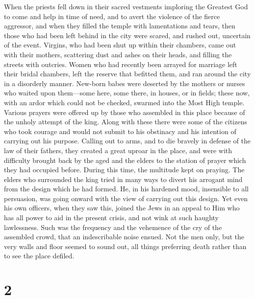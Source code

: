  When the priests fell down in their sacred vestments
imploring the Greatest God to come and help in time of need, and to
avert the violence of the fierce aggressor, and when they filled the
temple with lamentations and tears,  then those who had
been left behind in the city were scared, and rushed out, uncertain of
the event.  Virgins, who had been shut up within their
chambers, came out with their mothers, scattering dust and ashes on
their heads, and filling the streets with outcries. 
Women who had recently been arrayed for marriage left their bridal
chambers, left the reserve that befitted them, and ran around the city
in a disorderly manner.  New-born babes were deserted by
the mothers or nurses who waited upon them---some here, some there, in
houses, or in fields; these now, with an ardor which could not be
checked, swarmed into the Most High temple.  Various
prayers were offered up by those who assembled in this place because of
the unholy attempt of the king.  Along with these there
were some of the citizens who took courage and would not submit to his
obstinacy and his intention of carrying out his purpose. 
Calling out to arms, and to die bravely in defense of the law of their
fathers, they created a great uproar in the place, and were with
difficulty brought back by the aged and the elders to the station of
prayer which they had occupied before.  During this time,
the multitude kept on praying.  The elders who surrounded
the king tried in many ways to divert his arrogant mind from the design
which he had formed.  He, in his hardened mood,
insensible to all persuasion, was going onward with the view of carrying
out this design.  Yet even his own officers, when they
saw this, joined the Jews in an appeal to Him who has all power to aid
in the present crisis, and not wink at such haughty lawlessness.
 Such was the frequency and the vehemence of the cry of
the assembled crowd, that an indescribable noise ensued. 
Not the men only, but the very walls and floor seemed to sound out, all
things preferring death rather than to see the place defiled.

\hypertarget{section-1}{%
\section{2}\label{section-1}}

